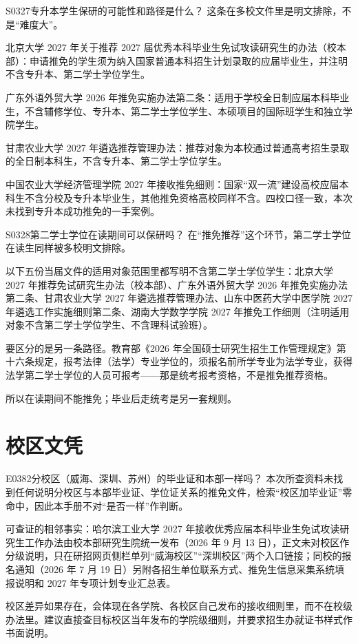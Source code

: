 \begin{qa}{S0327}{专升本学生保研的可能性和路径是什么？}
这条在多校文件里是明文排除，不是“难度大”。

北京大学 2027 年关于推荐 2027 届优秀本科毕业生免试攻读研究生的办法（校本部）：申请推免的学生须为纳入国家普通本科招生计划录取的应届毕业生，并注明不含专升本、第二学士学位学生。

广东外语外贸大学 2026 年推免实施办法第二条：适用于学校全日制应届本科毕业生，不含辅修学位、专升本、第二学士学位学生、本硕项目的国际班学生和独立学院学生。

甘肃农业大学 2027 年遴选推荐管理办法：推荐对象为本校通过普通高考招生录取的全日制本科生，不含专升本、第二学士学位学生。

中国农业大学经济管理学院 2027 年接收推免细则：国家“双一流”建设高校应届本科生不含分校及专升本毕业生，其他推免资格高校同样不含。四校口径一致，本次未找到专升本成功推免的一手案例。
\end{qa}

\begin{qa}{S0328}{第二学士学位在读期间可以保研吗？}
在“推免推荐”这个环节，第二学士学位在读生同样被多校明文排除。

以下五份当届文件的适用对象范围里都写明不含第二学士学位学生：北京大学 2027 年推荐免试研究生办法（校本部）、广东外语外贸大学 2026 年推免实施办法第二条、甘肃农业大学 2027 年遴选推荐管理办法、山东中医药大学中医学院 2027 年遴选工作实施细则第二条、湖南大学数学学院 2027 年推免工作细则（注明适用对象不含第二学士学位学生、不含理科试验班）。

要区分的是另一条路径。教育部《2026 年全国硕士研究生招生工作管理规定》第十六条规定，报考法律（法学）专业学位的，须报名前所学专业为法学专业，获得法学第二学士学位的人员可报考——那是统考报考资格，不是推免推荐资格。

所以在读期间不能推免；毕业后走统考是另一套规则。
\end{qa}

\section{校区文凭}
\begin{qa}{E0382}{分校区（威海、深圳、苏州）的毕业证和本部一样吗？}
本次所查资料未找到任何说明分校区与本部毕业证、学位证关系的推免文件，检索“校区加毕业证”零命中，因此本手册不对“是否一样”作判断。

可查证的相邻事实：哈尔滨工业大学 2027 年接收优秀应届本科毕业生免试攻读研究生工作办法由校本部研究生院统一发布（2026 年 9 月 13 日），正文未对校区作分级说明，只在研招网页侧栏单列“威海校区”“深圳校区”两个入口链接；同校的报名通知（2026 年 7 月 19 日）另附各招生单位联系方式、推免生信息采集系统填报说明和 2027 年专项计划专业汇总表。

校区差异如果存在，会体现在各学院、各校区自己发布的接收细则里，而不在校级办法里。建议直接查目标校区当年发布的学院级细则，并要求招生办就证书样式作书面说明。
\end{qa}

